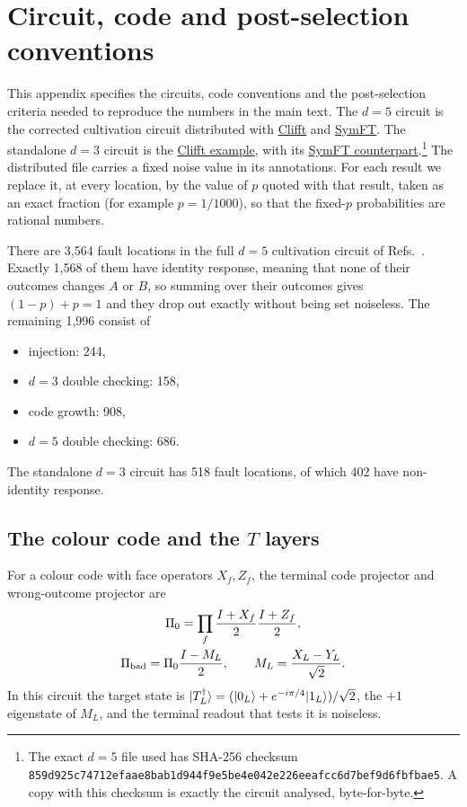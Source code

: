 \section{Circuit, code and post-selection conventions}\label{app:circuits}
This appendix specifies the circuits, code conventions and the post-selection criteria needed to reproduce the numbers in the main text.
The $d=5$ circuit is the corrected cultivation circuit distributed with \href{https://github.com/unitaryfoundation/clifft/blob/main/tests/fixtures/cultivation_d5.stim}{Clifft} and \href{https://github.com/haoliri0/SymFT_Test/blob/main/benchmark/circuit/msc_d5_inject_cultivate_p1e-3.stim}{SymFT}. The standalone $d=3$ circuit is the \href{https://github.com/unitaryfoundation/clifft/blob/main/docs/guide/circuits/circuit_d3_t_gate_p0.001.stim}{Clifft example}, with its \href{https://github.com/haoliri0/SymFT_Test/blob/main/benchmark/circuit/msc_d3_inject_cultivate_p1e-3.stim}{SymFT counterpart}.\footnote{The exact $d=5$ file used has SHA-256 checksum \nolinkurl{859d925c74712efaae8bab1d944f9e5be4e042e226eeafcc6d7bef9d6fbfbae5}. A copy with this checksum is exactly the circuit analysed, byte-for-byte.} The distributed file carries a fixed noise value in its annotations. For each result we replace it, at every location, by the value of $p$ quoted with that result, taken as an exact fraction (for example $p=1/1000$), so that the fixed-$p$ probabilities are rational numbers.


There are 3,564 fault locations in the full $d=5$ cultivation circuit of Refs.~\cite{clifft,soft}. Exactly 1,568 of them have identity response, meaning that none of their outcomes changes $A$ or $B$, so summing over their outcomes gives $(1-p)+p=1$ and they drop out exactly without being set noiseless. The remaining 1,996 consist of
\begin{itemize}
\item injection: 244,
\item $d=3$ double checking: 158,
\item code growth: 908,
\item $d=5$ double checking: 686.
\end{itemize}
The standalone $d=3$ circuit has 518 fault locations, of which 402 have non-identity response.


\subsection{The colour code and the \texorpdfstring{$T$}{T} layers}
For a colour code with face operators $X_f,Z_f$, the terminal code projector and
wrong-outcome projector are
\begin{equation}
 \begin{gathered}
 \Pi_0=\prod_f\frac{I+X_f}{2}\frac{I+Z_f}{2},\\
 \Pi_{\rm bad}=\Pi_0\frac{I-M_L}{2},\qquad
 M_L=\frac{X_L-Y_L}{\sqrt2}.
 \end{gathered}
 \label{eq:projectors}
\end{equation}
In this circuit the target state is $\lvert T_L^\dagger\rangle=(\lvert0_L\rangle+e^{-i\pi/4}\lvert1_L\rangle)/\sqrt2$, the $+1$ eigenstate of $M_L$, and the terminal readout that tests it is noiseless.

